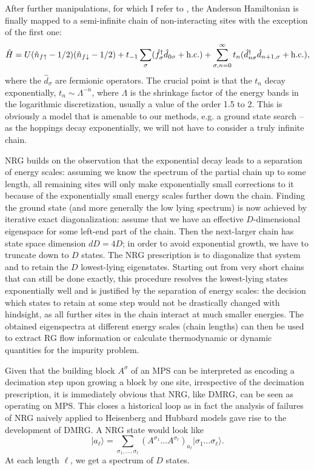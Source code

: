 \documentclass[a4paper,10pt,oneside,onecolumn,1p,times]{elsarticle}
\newcommand{\ket}[1]{\mbox{$| #1  \rangle$}}
\begin{document}
After further manipulations, for which I refer to \cite{Wilson75,Bulla08}, the Anderson Hamiltonian is finally mapped to a semi-infinite chain of non-interacting sites with the exception of the first one:
\begin{equation} 
\hat{H}= U (\hat{n}_{f\uparrow}-1/2) (\hat{n}_{f\downarrow}-1/2) + t_{-1} \sum_\sigma (\hat{f}^\dagger_\sigma \hat{d}_{0\sigma} + {\rm h.c.}) + \sum_{\sigma,n=0}^\infty t_n (\hat{d}^\dagger_{n\sigma} \hat{d}_{n+1,\sigma} + {\rm h.c.}),
\end{equation}
where the $\hat{d}_{\sigma}$ are fermionic operators.  The crucial point is that the $t_n$ decay exponentially, $t_n \sim \Lambda^{-n}$, where $\Lambda$ is the shrinkage factor of the energy bands in the logarithmic discretization, usually a value of the order 1.5 to 2. This is obviously a model that is amenable to our methods, e.g. a ground state search -- as the hoppings decay exponentially, we will not have to consider a truly infinite chain. 

NRG builds on the observation that the exponential decay leads to a separation of energy scales: assuming we know the spectrum of the partial chain up to some length, all remaining sites will only make exponentially small corrections to it because of the exponentially small energy scales further down the chain. Finding the ground state (and more generally the low lying spectrum) is now achieved by  iterative exact diagonalization: assume that we have an effective $D$-dimensional eigenspace for some left-end part of the chain. Then the next-larger chain has state space dimension $dD=4D$; in order to avoid exponential growth, we have to truncate down to $D$ states. The NRG prescription is to diagonalize that system and to retain the $D$ lowest-lying eigenstates. Starting out from very short chains that can still be done exactly, this procedure resolves the lowest-lying states exponentially well and is justified by the separation of energy scales: the decision which states to retain at some step would not be drastically changed with hindsight, as all further sites in the chain interact at much smaller energies. The obtained eigenspectra at different energy scales (chain lengths) can then be used to extract RG flow information or calculate thermodynamic or dynamic quantities for the impurity problem. 

Given that the building block $A^\sigma$ of an MPS can be interpreted as encoding a decimation step upon growing a block by one site, irrespective of the decimation prescription, it is immediately obvious that NRG, like DMRG, can be seen as operating on MPS\cite{Weichselbaum09}. This closes a historical loop as in fact the analysis of failures of NRG  naively applied to Heisenberg and Hubbard models gave rise to the development of DMRG. A NRG  state would look like
\begin{equation}
\ket{a_\ell} = \sum_{\sigma_1,\ldots,\sigma_\ell} (A^{\sigma_1} \ldots  A^{\sigma_\ell})_{a_\ell} \ket{\sigma_1\ldots\sigma_\ell}.
\end{equation}
At each length $\ell$, we get a spectrum of $D$ states.
\end{document}

